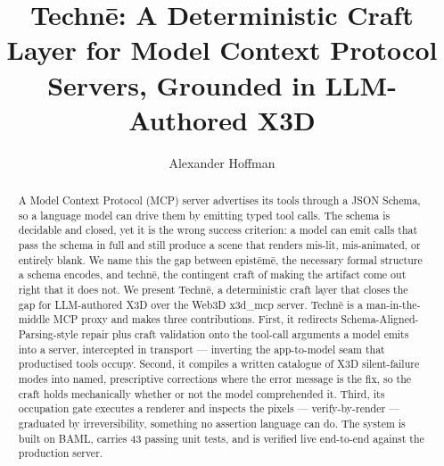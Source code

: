 \documentclass[sigconf,nonacm,screen,anonymous]{acmart}
\begin{document}
\title{Technē: A Deterministic Craft Layer for Model Context Protocol Servers, Grounded in LLM-Authored X3D}

\author{Alexander Hoffman}


\begin{abstract}
A Model Context Protocol (MCP) server advertises its tools through a JSON Schema, so a language model can drive them by emitting typed tool calls. The schema is decidable and closed, yet it is the wrong success criterion: a model can emit calls that pass the schema in full and still produce a scene that renders mis-lit, mis-animated, or entirely blank. We name this the gap between epistēmē, the necessary formal structure a schema encodes, and technē, the contingent craft of making the artifact come out right that it does not. We present Technē, a deterministic craft layer that closes the gap for LLM-authored X3D over the Web3D x3d\_mcp server. Technē is a man-in-the-middle MCP proxy and makes three contributions. First, it redirects Schema-Aligned-Parsing-style repair plus craft validation onto the tool-call arguments a model emits into a server, intercepted in transport — inverting the app-to-model seam that productised tools occupy. Second, it compiles a written catalogue of X3D silent-failure modes into named, prescriptive corrections where the error message is the fix, so the craft holds mechanically whether or not the model comprehended it. Third, its occupation gate executes a renderer and inspects the pixels — verify-by-render — graduated by irreversibility, something no assertion language can do. The system is built on BAML, carries 43 passing unit tests, and is verified live end-to-end against the production server.
\end{abstract}

\end{document}
